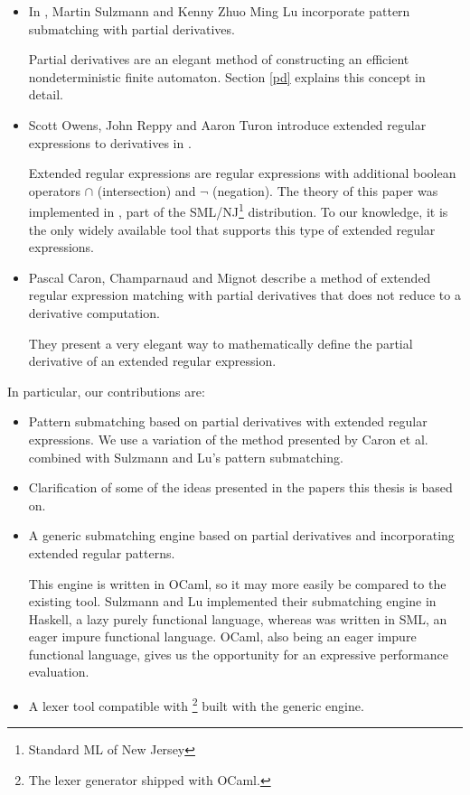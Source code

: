 \begin{itemize}
      
   \item In \cite{pdpat}, Martin Sulzmann and Kenny Zhuo Ming Lu incorporate
      pattern submatching with partial derivatives.

      Partial derivatives are an elegant method of constructing an efficient
      nondeterministic finite automaton. Section \ref{pd} explains this concept
      in detail.

   \item Scott Owens, John Reppy and Aaron Turon introduce extended regular
      expressions to derivatives in \cite{re-deriv}.

      Extended regular expressions are regular expressions with additional
      boolean operators $\cap$ (intersection) and $\neg$ (negation). The theory
      of this paper was implemented in \mlulex, part of the
      SML/NJ\footnote{Standard ML of New Jersey} distribution. To our knowledge,
      it is the only widely available tool that supports this type of extended
      regular expressions.

   \item Pascal Caron, Champarnaud and Mignot describe a method of extended
      regular expression matching with partial derivatives that does not reduce
      to a derivative computation\cite{pdere}.

      They present a very elegant way to mathematically define the partial
      derivative of an extended regular expression.

\end{itemize}

In particular, our contributions are:

\begin{itemize}

   \item Pattern submatching based on partial derivatives with extended regular
      expressions. We use a variation of the method presented by Caron et al.
      combined with Sulzmann and Lu's pattern submatching.

   \item Clarification of some of the ideas presented in the papers this thesis
      is based on.

   \item A generic submatching engine based on partial derivatives and
      incorporating extended regular patterns.
      
      This engine is written in OCaml, so it may more easily be compared to the
      existing \mlulex{} tool. Sulzmann and Lu implemented their submatching
      engine in Haskell, a lazy purely functional language, whereas \mlulex{}
      was written in SML, an eager impure functional language. OCaml, also being
      an eager impure functional language, gives us the opportunity for an
      expressive performance evaluation.

   \item A lexer tool compatible with \ocamllex\footnote{The lexer generator
      shipped with OCaml.} built with the generic engine.

\end{itemize}


